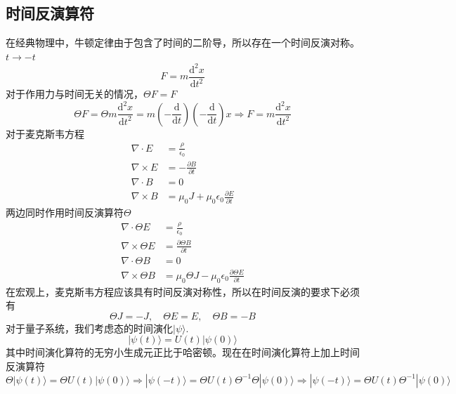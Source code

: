 \documentclass{article}
\numberwithin{equation}{subsection}
\begin{document}
\subsection{时间反演算符}
在经典物理中，牛顿定律由于包含了时间的二阶导，所以存在一个时间反演对称。$t\rightarrow -t$
\begin{equation}
    F=m\frac{\mathrm{d}^2x}{\mathrm{d}t^2}
\end{equation}
对于作用力与时间无关的情况，$\Theta F=F$
\begin{equation}
    \Theta F=\Theta m\frac{\mathrm{d}^2x}{\mathrm{d}t^2}=m\left(-\frac{\mathrm{d}}{\mathrm{d}t}\right)\left(-\frac{\mathrm{d}}{\mathrm{d}t}\right)x\Rightarrow F=m\frac{\mathrm{d}^2x}{\mathrm{d}t^2}
\end{equation}
对于麦克斯韦方程
\begin{equation}
    \begin{split}
        \nabla\cdot E&=\frac{\rho}{\epsilon_0}\\
        \nabla\times E&=-\frac{\partial B}{\partial t}\\
        \nabla\cdot B&=0\\
        \nabla\times B&=\mu_0J+\mu_0\epsilon_0\frac{\partial E}{\partial t}
    \end{split}
\end{equation}
两边同时作用时间反演算符$\Theta$
\begin{equation}
    \begin{split}
        \nabla\cdot \Theta E&=\frac{\rho}{\epsilon_0}\\
        \nabla\times \Theta E&=\frac{\partial \Theta B}{\partial t}\\
        \nabla\cdot \Theta B&=0\\
        \nabla\times \Theta B&=\mu_0\Theta J-\mu_0\epsilon_0\frac{\partial \Theta E}{\partial t}
    \end{split}
\end{equation}
在宏观上，麦克斯韦方程应该具有时间反演对称性，所以在时间反演的要求下必须有
\begin{equation}
    \Theta J=-J,\quad\Theta E=E,\quad\Theta B=-B
\end{equation}
对于量子系统，我们考虑态的时间演化$|\psi\rangle$.
\begin{equation}
    |\psi(t)\rangle=U(t)|\psi(0)\rangle
\end{equation}
其中时间演化算符的无穷小生成元正比于哈密顿。现在在时间演化算符上加上时间反演算符
\begin{equation}
    \Theta|\psi(t)\rangle=\Theta U(t)|\psi(0)\rangle\Rightarrow |\psi(-t)\rangle=\Theta U(t)\Theta^{-1} \Theta|\psi(0)\rangle\Rightarrow |\psi(-t)\rangle=\Theta U(t)\Theta^{-1}|\psi(0)\rangle
\end{equation}
\end{document}
